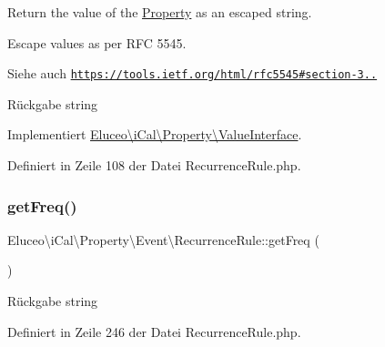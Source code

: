 Return the value of the \mbox{\hyperlink{class_eluceo_1_1i_cal_1_1_property}{Property}} as an escaped string.

Escape values as per R\+FC 5545.

\begin{DoxySeeAlso}{Siehe auch}
\href{https://tools.ietf.org/html/rfc5545#section-3.3.11}{\tt https\+://tools.\+ietf.\+org/html/rfc5545\#section-\/3..}
\end{DoxySeeAlso}
\begin{DoxyReturn}{Rückgabe}
string 
\end{DoxyReturn}


Implementiert \mbox{\hyperlink{interface_eluceo_1_1i_cal_1_1_property_1_1_value_interface_a408412ae5d11fd3f239c7985aede8c32}{Eluceo\textbackslash{}i\+Cal\textbackslash{}\+Property\textbackslash{}\+Value\+Interface}}.



Definiert in Zeile 108 der Datei Recurrence\+Rule.\+php.

\mbox{\label{class_eluceo_1_1i_cal_1_1_property_1_1_event_1_1_recurrence_rule_ac484c1c9e796e58d8226294d0ece2553}} 
\subsubsection{\texorpdfstring{get\+Freq()}{getFreq()}\hspace{0.1cm}{\footnotesize\ttfamily [1/3]}}
{\footnotesize\ttfamily Eluceo\textbackslash{}i\+Cal\textbackslash{}\+Property\textbackslash{}\+Event\textbackslash{}\+Recurrence\+Rule\+::get\+Freq (\begin{DoxyParamCaption}{ }\end{DoxyParamCaption})}

\begin{DoxyReturn}{Rückgabe}
string 
\end{DoxyReturn}


Definiert in Zeile 246 der Datei Recurrence\+Rule.\+php.

\mbox{\label{class_eluceo_1_1i_cal_1_1_property_1_1_event_1_1_recurrence_rule_ac484c1c9e796e58d8226294d0ece2553}} 
